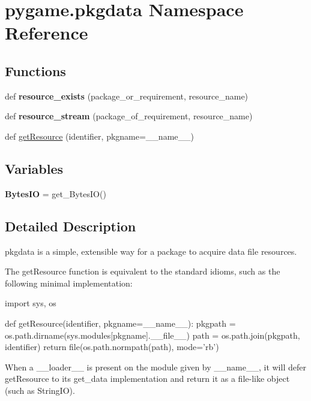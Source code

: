 \hypertarget{namespacepygame_1_1pkgdata}{}\section{pygame.\+pkgdata Namespace Reference}
\label{namespacepygame_1_1pkgdata}
\subsection*{Functions}
\begin{DoxyCompactItemize}
\item 
\mbox{\label{namespacepygame_1_1pkgdata_ab48c1a7af4a4e385db3c8f54b00d6dcd}} 
def {\bfseries resource\+\_\+exists} (package\+\_\+or\+\_\+requirement, resource\+\_\+name)
\item 
\mbox{\label{namespacepygame_1_1pkgdata_a81b6fca236e12605b13c9d418a81c653}} 
def {\bfseries resource\+\_\+stream} (package\+\_\+of\+\_\+requirement, resource\+\_\+name)
\item 
def \hyperlink{namespacepygame_1_1pkgdata_a781dc67594d56b559fbb71d979e6c135}{get\+Resource} (identifier, pkgname=\+\_\+\+\_\+name\+\_\+\+\_\+)
\end{DoxyCompactItemize}
\subsection*{Variables}
\begin{DoxyCompactItemize}
\item 
\mbox{\label{namespacepygame_1_1pkgdata_ab09383768f833308c2ecbea06d8aeccc}} 
{\bfseries Bytes\+IO} = get\+\_\+\+Bytes\+IO()
\end{DoxyCompactItemize}


\subsection{Detailed Description}
\begin{DoxyVerb}pkgdata is a simple, extensible way for a package to acquire data file 
resources.

The getResource function is equivalent to the standard idioms, such as
the following minimal implementation:
    
    import sys, os

    def getResource(identifier, pkgname=__name__):
pkgpath = os.path.dirname(sys.modules[pkgname].__file__)
path = os.path.join(pkgpath, identifier)
return file(os.path.normpath(path), mode='rb')

When a __loader__ is present on the module given by __name__, it will defer
getResource to its get_data implementation and return it as a file-like
object (such as StringIO).
\end{DoxyVerb}
 

